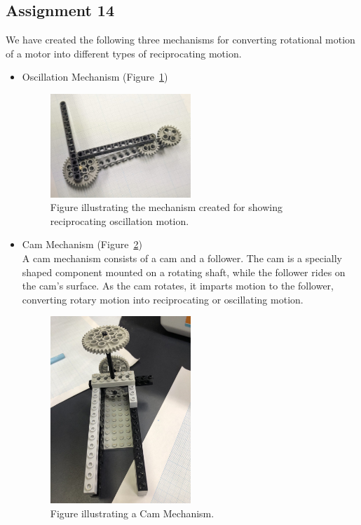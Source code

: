 \documentclass[12pt,a4paper]{report}
\begin{document}
\subsection{\textbf{Assignment 14}}
We have created the following three mechanisms for converting rotational motion of a motor into different types of reciprocating 
motion.
\begin{itemize}
    \item Oscillation Mechanism (Figure~\ref{fig:ass14-3})
    \begin{figure}[htbp]
        \centering
        \includegraphics[width=0.5\textwidth]{figures/ass14-3}
        \caption{Figure illustrating the mechanism created for showing reciprocating oscillation motion.}
        \label{fig:ass14-3}
    \end{figure}

    \item Cam Mechanism (Figure~\ref{fig:ass14-2})\\
    A cam mechanism consists of a cam and a follower. The cam is a specially shaped component mounted on a rotating shaft, 
    while the follower rides on the cam's surface. As the cam rotates, it imparts motion to the follower, converting rotary 
    motion into reciprocating or oscillating motion.
    \begin{figure}[htbp]
        \centering
        \includegraphics[width=0.5\textwidth]{figures/ass14-2}
        \caption{Figure illustrating a Cam Mechanism.}
        \label{fig:ass14-2}
    \end{figure}


\end{itemize}
\end{document}
